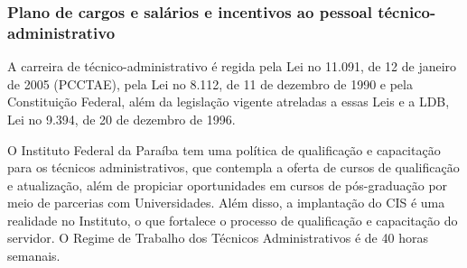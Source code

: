 \subsubsection{Plano de cargos e sal\'arios e incentivos ao pessoal t\'ecnico-administrativo}

A carreira de técnico-administrativo é regida pela Lei no 11.091, de 12 de janeiro de 2005 (PCCTAE), pela Lei no 8.112, de 11 de dezembro de 1990 e pela Constituição Federal, além da legislação vigente atreladas a essas Leis e a LDB, Lei no 9.394, de 20 de dezembro de 1996. 

O Instituto Federal da Paraíba tem uma política de qualificação e capacitação para os técnicos administrativos, que contempla a oferta de cursos de qualificação e atualização, além de propiciar oportunidades em cursos de pós-graduação por meio de parcerias com Universidades. Além disso, a implantação do CIS é uma realidade no Instituto, o que fortalece o processo de qualificação e capacitação do servidor. O Regime de Trabalho dos Técnicos Administrativos é de 40 horas semanais.



